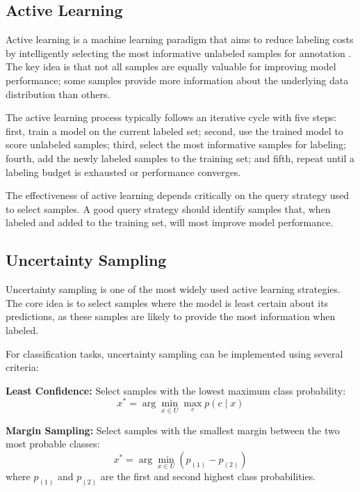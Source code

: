 \documentclass[conference]{IEEEtran}
\begin{document}
\subsection{Active Learning}

Active learning is a machine learning paradigm that aims to reduce labeling costs by intelligently selecting the most informative unlabeled samples for annotation \cite{sener2018active}. The key idea is that not all samples are equally valuable for improving model performance; some samples provide more information about the underlying data distribution than others.

The active learning process typically follows an iterative cycle with five steps: first, train a model on the current labeled set; second, use the trained model to score unlabeled samples; third, select the most informative samples for labeling; fourth, add the newly labeled samples to the training set; and fifth, repeat until a labeling budget is exhausted or performance converges.

The effectiveness of active learning depends critically on the query strategy used to select samples. A good query strategy should identify samples that, when labeled and added to the training set, will most improve model performance.

\subsection{Uncertainty Sampling}

Uncertainty sampling is one of the most widely used active learning strategies. The core idea is to select samples where the model is least certain about its predictions, as these samples are likely to provide the most information when labeled.

For classification tasks, uncertainty sampling can be implemented using several criteria:

\textbf{Least Confidence:} Select samples with the lowest maximum class probability:
\begin{equation}
x^* = \arg\min_{x \in U} \max_c p(c \mid x)
\end{equation}

\textbf{Margin Sampling:} Select samples with the smallest margin between the two most probable classes:
\begin{equation}
x^* = \arg\min_{x \in U} (p_{(1)} - p_{(2)})
\end{equation}
where $p_{(1)}$ and $p_{(2)}$ are the first and second highest class probabilities.
\end{document}
